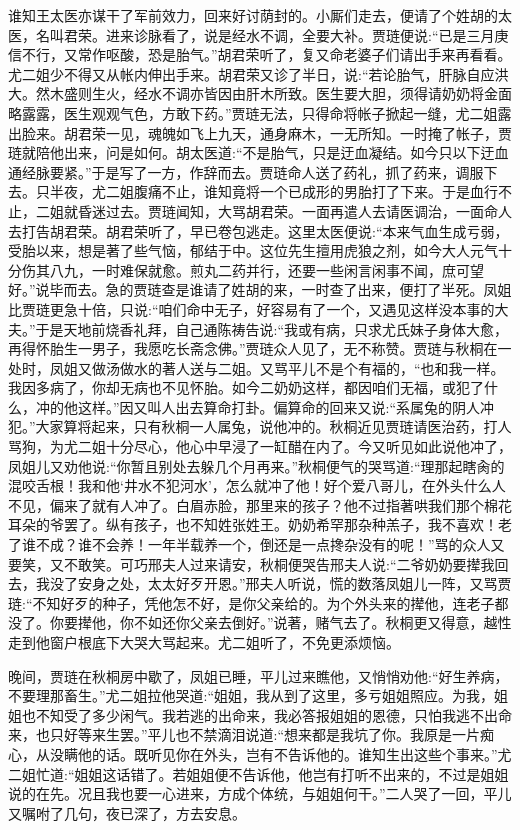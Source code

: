 \begin{parag}
    谁知王太医亦谋干了军前效力，回来好讨荫封的。小厮们走去，便请了个姓胡的太医，名叫君荣。进来诊脉看了，说是经水不调，全要大补。贾琏便说:“已是三月庚信不行，又常作呕酸，恐是胎气。”胡君荣听了，复又命老婆子们请出手来再看看。尤二姐少不得又从帐内伸出手来。胡君荣又诊了半日，说:“若论胎气，肝脉自应洪大。然木盛则生火，经水不调亦皆因由肝木所致。医生要大胆，须得请奶奶将金面略露露，医生观观气色，方敢下药。”贾琏无法，只得命将帐子掀起一缝，尤二姐露出脸来。胡君荣一见，魂魄如飞上九天，通身麻木，一无所知。一时掩了帐子，贾琏就陪他出来，问是如何。胡太医道:“不是胎气，只是迂血凝结。如今只以下迂血通经脉要紧。”于是写了一方，作辞而去。贾琏命人送了药礼，抓了药来，调服下去。只半夜，尤二姐腹痛不止，谁知竟将一个已成形的男胎打了下来。于是血行不止，二姐就昏迷过去。贾琏闻知，大骂胡君荣。一面再遣人去请医调治，一面命人去打告胡君荣。胡君荣听了，早已卷包逃走。这里太医便说:“本来气血生成亏弱，受胎以来，想是著了些气恼，郁结于中。这位先生擅用虎狼之剂，如今大人元气十分伤其八九，一时难保就愈。煎丸二药并行，还要一些闲言闲事不闻，庶可望好。”说毕而去。急的贾琏查是谁请了姓胡的来，一时查了出来，便打了半死。凤姐比贾琏更急十倍，只说:“咱们命中无子，好容易有了一个，又遇见这样没本事的大夫。”于是天地前烧香礼拜，自己通陈祷告说:“我或有病，只求尤氏妹子身体大愈，再得怀胎生一男子，我愿吃长斋念佛。”贾琏众人见了，无不称赞。贾琏与秋桐在一处时，凤姐又做汤做水的著人送与二姐。又骂平儿不是个有福的，“也和我一样。我因多病了，你却无病也不见怀胎。如今二奶奶这样，都因咱们无福，或犯了什么，冲的他这样。”因又叫人出去算命打卦。偏算命的回来又说:“系属兔的阴人冲犯。”大家算将起来，只有秋桐一人属兔，说他冲的。秋桐近见贾琏请医治药，打人骂狗，为尤二姐十分尽心，他心中早浸了一缸醋在内了。今又听见如此说他冲了，凤姐儿又劝他说:“你暂且别处去躲几个月再来。”秋桐便气的哭骂道:“理那起瞎肏的混咬舌根！我和他‘井水不犯河水’，怎么就冲了他！好个爱八哥儿，在外头什么人不见，偏来了就有人冲了。白眉赤脸，那里来的孩子？他不过指著哄我们那个棉花耳朵的爷罢了。纵有孩子，也不知姓张姓王。奶奶希罕那杂种羔子，我不喜欢！老了谁不成？谁不会养！一年半载养一个，倒还是一点搀杂没有的呢！”骂的众人又要笑，又不敢笑。可巧邢夫人过来请安，秋桐便哭告邢夫人说:“二爷奶奶要撵我回去，我没了安身之处，太太好歹开恩。”邢夫人听说，慌的数落凤姐儿一阵，又骂贾琏:“不知好歹的种子，凭他怎不好，是你父亲给的。为个外头来的撵他，连老子都没了。你要撵他，你不如还你父亲去倒好。”说著，赌气去了。秋桐更又得意，越性走到他窗户根底下大哭大骂起来。尤二姐听了，不免更添烦恼。
\end{parag}


\begin{parag}
    晚间，贾琏在秋桐房中歇了，凤姐已睡，平儿过来瞧他，又悄悄劝他:“好生养病，不要理那畜生。”尤二姐拉他哭道:“姐姐，我从到了这里，多亏姐姐照应。为我，姐姐也不知受了多少闲气。我若逃的出命来，我必答报姐姐的恩德，只怕我逃不出命来，也只好等来生罢。”平儿也不禁滴泪说道:“想来都是我坑了你。我原是一片痴心，从没瞒他的话。既听见你在外头，岂有不告诉他的。谁知生出这些个事来。”尤二姐忙道:“姐姐这话错了。若姐姐便不告诉他，他岂有打听不出来的，不过是姐姐说的在先。况且我也要一心进来，方成个体统，与姐姐何干。”二人哭了一回，平儿又嘱咐了几句，夜已深了，方去安息。
\end{parag}


